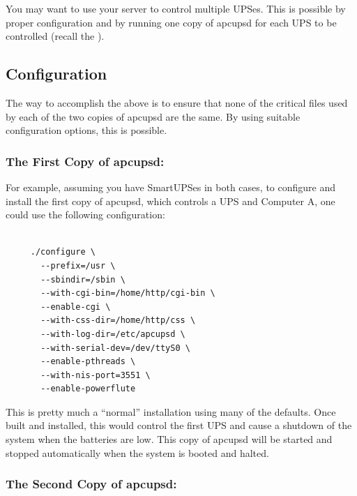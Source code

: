 {{{{{{{{{You may want to use your server to control multiple UPSes. This is possible by
proper configuration and by running one copy of apcupsd for each UPS to be
controlled (recall the 
). 

\label{Configuration}

\subsection*{Configuration}

The way to accomplish the above is to ensure that none of the critical files
used by each of the two copies of apcupsd are the same. By using suitable
configuration options, this is possible. 

\label{The-First-Copy-of-apcupsd}

\subsubsection*{The First Copy of apcupsd:}

For example, assuming you have SmartUPSes in both cases, to configure and
install the first copy of apcupsd, which controls a UPS and Computer A, one
could use the following configuration: 

\footnotesize
\begin{verbatim}
     
     ./configure \
       --prefix=/usr \
       --sbindir=/sbin \
       --with-cgi-bin=/home/http/cgi-bin \
       --enable-cgi \
       --with-css-dir=/home/http/css \
       --with-log-dir=/etc/apcupsd \
       --with-serial-dev=/dev/ttyS0 \
       --enable-pthreads \
       --with-nis-port=3551 \
       --enable-powerflute
\end{verbatim}
\normalsize

This is pretty much a ``normal'' installation using many of the defaults. Once
built and installed, this would control the first UPS and cause a shutdown of
the system when the batteries are low.  This copy of apcupsd will be started
and stopped automatically when the system is booted and halted. 

\label{The-Second-Copy-of-apcupsd}

\subsubsection*{The Second Copy of apcupsd:}

}}}}}}}}}
